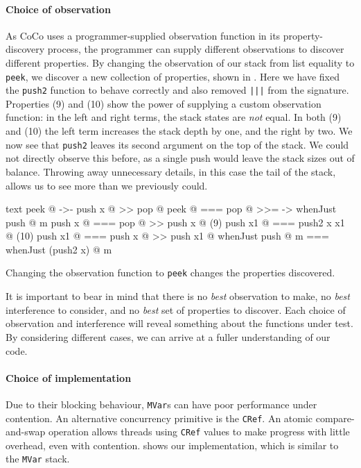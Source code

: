 \paragraph{Choice of observation}
As CoCo uses a programmer-supplied observation function in its
property-discovery process, the programmer can supply different
observations to discover different properties.  By changing the
observation of our stack from list equality to \verb|peek|, we
discover a new collection of properties, shown in
.  Here we have fixed the \verb|push2| function
to behave correctly and also removed \verb#|||# from the signature.
Properties (9) and (10) show the power of supplying a custom
observation function: in the left and right terms, the stack states
are \emph{not} equal.  In both (9) and (10) the left term increases
the stack depth by one, and the right by two.  We now see that
\verb|push2| leaves its second argument on the top of the stack.  We
could not directly observe this before, as a single push would leave
the stack sizes out of balance.  Throwing away unnecessary details, in
this case the tail of the stack, allows us to see more than we
previously could.

\begin{listing}
\centering
\begin{cminted}{text}
           peek @  ->-  push x @ >> pop @
           peek @  ===  pop @ >>= \m -> whenJust push @ m
         push x @  ===  pop @ >> push x @
(9)     push x1 @  ===  push2 x x1 @
(10)    push x1 @  ===  push x @ >> push x1 @
whenJust push @ m  ===  whenJust (push2 x) @ m
\end{cminted}
\caption[Changing the obervation function changes the properties discovered.]{Changing the observation function to \texttt{peek} changes the properties discovered.}\label{lst:lockstack4}
\end{listing}

It is important to bear in mind that there is no \emph{best}
observation to make, no \emph{best} interference to consider, and no
\emph{best} set of properties to discover.  Each choice of observation
and interference will reveal something about the functions under test.
By considering different cases, we can arrive at a fuller
understanding of our code.

\paragraph{Choice of implementation}
Due to their blocking behaviour, \verb|MVar|s can have poor
performance under contention.  An alternative concurrency primitive is
the \verb|CRef|.  An atomic compare-and-swap operation allows threads
using \verb|CRef| values to make progress with little overhead, even
with contention.   shows our implementation, which
is similar to the \verb|MVar| stack.

